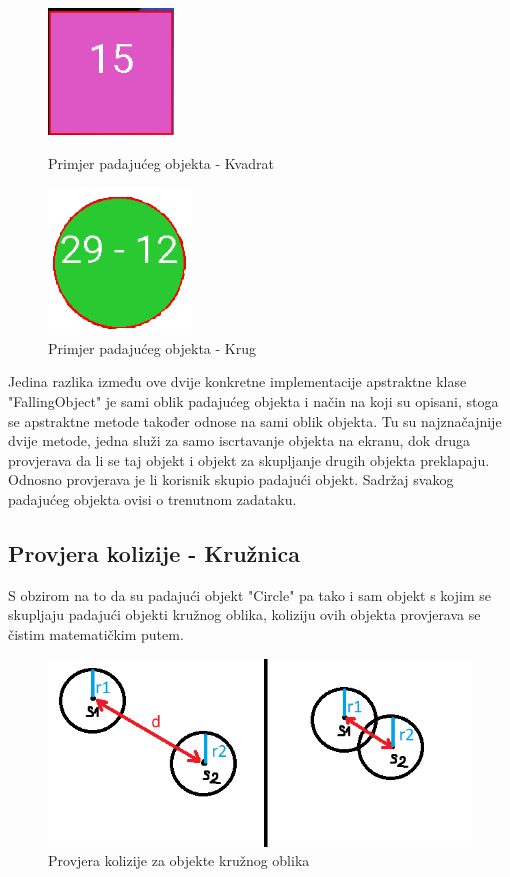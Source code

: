 \documentclass[times, utf8, zavrsni, numeric]{fer}
\begin{document}
	
		\begin{figure}[!htb]
			\begin{minipage}{0.48\textwidth}
				\centering
				\includegraphics[scale=0.6]{"slike/square.png"} 
				\caption{Primjer padajućeg objekta - Kvadrat}
				\label{fig:squre}
			\end{minipage}\hfill
			\begin{minipage}{0.48\textwidth}
				\centering
				\includegraphics[scale=0.6]{"slike/circle.png"} 
				\caption{Primjer padajućeg objekta - Krug}
				\label{fig:circle}
			\end{minipage}
		\end{figure}
		
		Jedina razlika između ove dvije konkretne implementacije apstraktne klase "FallingObject" je sami oblik padajućeg objekta i način na koji su opisani, stoga se apstraktne metode također odnose na sami oblik objekta.
		Tu su najznačajnije  dvije metode, jedna služi za samo iscrtavanje objekta na ekranu, dok druga provjerava da li se taj objekt i objekt za skupljanje drugih objekta preklapaju. Odnosno provjerava je li korisnik skupio padajući objekt.
		Sadržaj svakog padajućeg objekta ovisi o trenutnom zadataku. 
		
	\subsection{Provjera kolizije - Kružnica}
	S obzirom na to da su padajući objekt "Circle" pa tako i sam objekt s kojim se skupljaju padajući objekti kružnog oblika, koliziju ovih objekta provjerava se čistim matematičkim putem. 
	
		\begin{figure}[H]
			\includegraphics[scale=0.6]{"slike/circlekolizija.png"} 
			\centering
			\caption{Provjera kolizije za objekte kružnog oblika}
			\label{fig:kolizijacircle}
		\end{figure}
	
\end{document}

